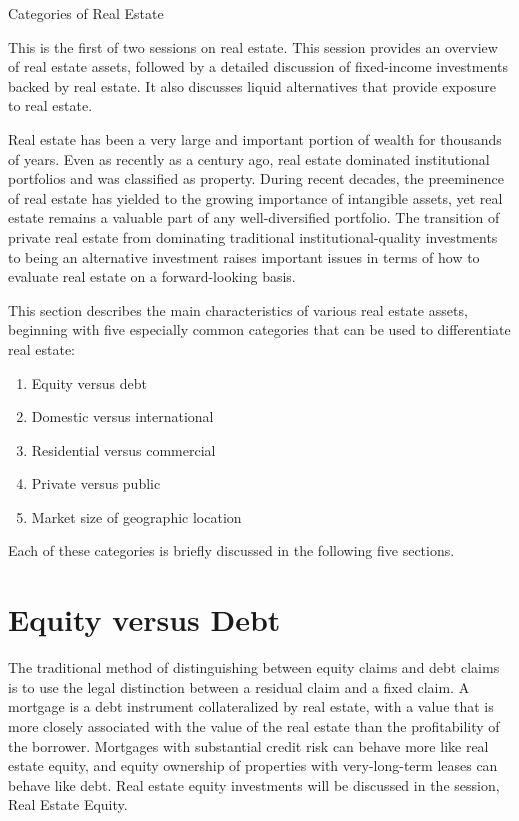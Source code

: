 \documentclass[11pt]{article}
\begin{document}
Categories of Real Estate

This is the first of two sessions on real estate. This session provides an overview of real estate assets, followed by a detailed discussion of fixed-income investments backed by real estate. It also discusses liquid alternatives that provide exposure to real estate.

Real estate has been a very large and important portion of wealth for thousands of years. Even as recently as a century ago, real estate dominated institutional portfolios and was classified as property. During recent decades, the preeminence of real estate has yielded to the growing importance of intangible assets, yet real estate remains a valuable part of any well-diversified portfolio. The transition of private real estate from dominating traditional institutional-quality investments to being an alternative investment raises important issues in terms of how to evaluate real estate on a forward-looking basis.

This section describes the main characteristics of various real estate assets, beginning with five especially common categories that can be used to differentiate real estate:

\begin{enumerate}
  \item Equity versus debt

  \item Domestic versus international

  \item Residential versus commercial

  \item Private versus public

  \item Market size of geographic location

\end{enumerate}

Each of these categories is briefly discussed in the following five sections.

\section*{Equity versus Debt}
The traditional method of distinguishing between equity claims and debt claims is to use the legal distinction between a residual claim and a fixed claim. A mortgage is a debt instrument collateralized by real estate, with a value that is more closely associated with the value of the real estate than the profitability of the borrower. Mortgages with substantial credit risk can behave more like real estate equity, and equity ownership of properties with very-long-term leases can behave like debt. Real estate equity investments will be discussed in the session, Real Estate Equity.
\end{document}
